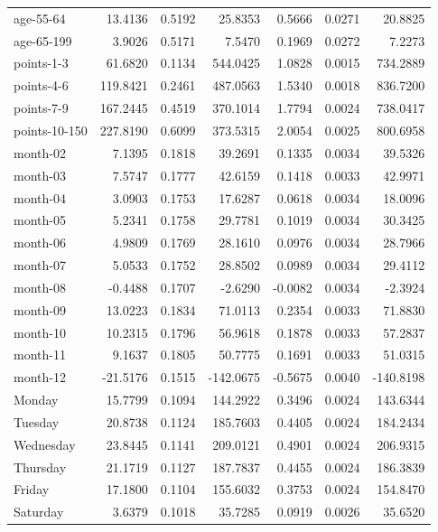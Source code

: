 \documentclass[10pt]{article}
\begin{document}
\begin{table}[b!]
\begin{tabular}{lrrrrrr}
  age-55-64 & 13.4136 & 0.5192 & 25.8353 & 0.5666 & 0.0271 & 20.8825 \\ 
  age-65-199 & 3.9026 & 0.5171 & 7.5470 & 0.1969 & 0.0272 & 7.2273 \\ 
  points-1-3 & 61.6820 & 0.1134 & 544.0425 & 1.0828 & 0.0015 & 734.2889 \\ 
  points-4-6 & 119.8421 & 0.2461 & 487.0563 & 1.5340 & 0.0018 & 836.7200 \\ 
  points-7-9 & 167.2445 & 0.4519 & 370.1014 & 1.7794 & 0.0024 & 738.0417 \\ 
  points-10-150 & 227.8190 & 0.6099 & 373.5315 & 2.0054 & 0.0025 & 800.6958 \\ 
  month-02 & 7.1395 & 0.1818 & 39.2691 & 0.1335 & 0.0034 & 39.5326 \\ 
  month-03 & 7.5747 & 0.1777 & 42.6159 & 0.1418 & 0.0033 & 42.9971 \\ 
  month-04 & 3.0903 & 0.1753 & 17.6287 & 0.0618 & 0.0034 & 18.0096 \\ 
  month-05 & 5.2341 & 0.1758 & 29.7781 & 0.1019 & 0.0034 & 30.3425 \\ 
  month-06 & 4.9809 & 0.1769 & 28.1610 & 0.0976 & 0.0034 & 28.7966 \\ 
  month-07 & 5.0533 & 0.1752 & 28.8502 & 0.0989 & 0.0034 & 29.4112 \\ 
  month-08 & -0.4488 & 0.1707 & -2.6290 & -0.0082 & 0.0034 & -2.3924 \\ 
  month-09 & 13.0223 & 0.1834 & 71.0113 & 0.2354 & 0.0033 & 71.8830 \\ 
  month-10 & 10.2315 & 0.1796 & 56.9618 & 0.1878 & 0.0033 & 57.2837 \\ 
  month-11 & 9.1637 & 0.1805 & 50.7775 & 0.1691 & 0.0033 & 51.0315 \\ 
  month-12 & -21.5176 & 0.1515 & -142.0675 & -0.5675 & 0.0040 & -140.8198 \\ 
  Monday & 15.7799 & 0.1094 & 144.2922 & 0.3496 & 0.0024 & 143.6344 \\ 
  Tuesday & 20.8738 & 0.1124 & 185.7603 & 0.4405 & 0.0024 & 184.2434 \\ 
  Wednesday & 23.8445 & 0.1141 & 209.0121 & 0.4901 & 0.0024 & 206.9315 \\ 
  Thursday & 21.1719 & 0.1127 & 187.7837 & 0.4455 & 0.0024 & 186.3839 \\ 
  Friday & 17.1800 & 0.1104 & 155.6032 & 0.3753 & 0.0024 & 154.8470 \\ 
  Saturday & 3.6379 & 0.1018 & 35.7285 & 0.0919 & 0.0026 & 35.6520 \\ 

\end{tabular}
\end{table}
\end{document}
